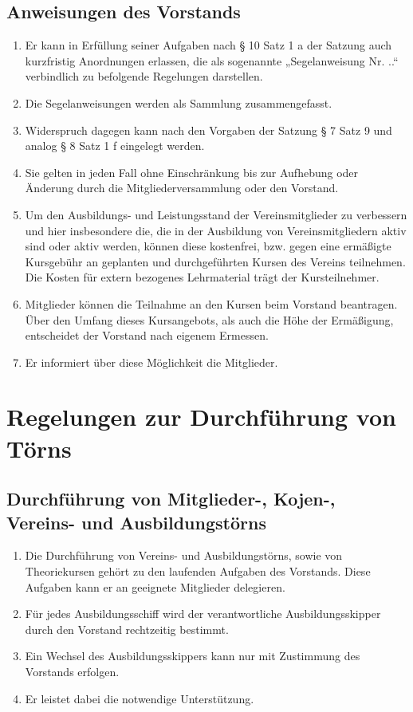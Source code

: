 \documentclass[10pt, twocolumn, parskip=half]{scrartcl}
\begin{document}
\subsection{Anweisungen des Vorstands}
\begin{enumerate}[noitemsep]
	\item Er kann in Erfüllung seiner Aufgaben nach § 10 Satz 1 a der Satzung auch kurzfristig Anordnungen erlassen, die als sogenannte „Segelanweisung Nr. ..“ verbindlich zu befolgende Regelungen darstellen.
	\item Die Segelanweisungen werden als Sammlung zusammengefasst.
	\item Widerspruch dagegen kann nach den Vorgaben der Satzung § 7 Satz 9 und analog § 8 Satz 1 f eingelegt werden.
	\item Sie gelten in jeden Fall ohne Einschränkung bis zur Aufhebung oder Änderung durch die Mitgliederversammlung oder den Vorstand.
	\item Um den Ausbildungs- und Leistungsstand der Vereinsmitglieder zu verbessern und hier insbesondere die, die in der Ausbildung von Vereinsmitgliedern aktiv sind oder aktiv werden, können diese kostenfrei, bzw. gegen eine ermäßigte Kursgebühr an geplanten und durchgeführten Kursen des Vereins teilnehmen. Die Kosten für extern bezogenes Lehrmaterial trägt der Kursteilnehmer.
	\item Mitglieder können die Teilnahme an den Kursen beim Vorstand beantragen. Über den Umfang dieses Kursangebots, als auch die Höhe der Ermäßigung, entscheidet der Vorstand nach eigenem Ermessen.
	\item Er informiert über diese Möglichkeit die Mitglieder.
\end{enumerate}


\section*{Regelungen zur Durchführung von Törns}
\subsection{Durchführung von Mitglieder-, Kojen-, Vereins- und Ausbildungstörns}
\begin{enumerate}[noitemsep]
	\item Die Durchführung von Vereins- und Ausbildungstörns, sowie von Theoriekursen gehört zu den laufenden Aufgaben des Vorstands. Diese Aufgaben kann er an geeignete Mitglieder delegieren.
	\item Für jedes Ausbildungsschiff wird der verantwortliche Ausbildungsskipper durch den Vorstand rechtzeitig bestimmt.
	\item Ein Wechsel des Ausbildungsskippers kann nur mit Zustimmung des Vorstands erfolgen.
	\item Er leistet dabei die notwendige Unterstützung.
\end{enumerate}
\end{document}
